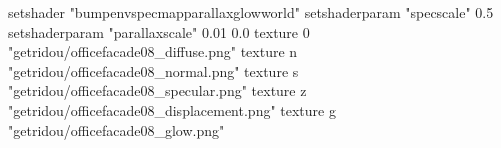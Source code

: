 setshader "bumpenvspecmapparallaxglowworld"
setshaderparam "specscale" 0.5
setshaderparam "parallaxscale" 0.01 0.0
texture 0 "getridou/officefacade08_diffuse.png"
texture n "getridou/officefacade08_normal.png"
texture s "getridou/officefacade08_specular.png"
texture z "getridou/officefacade08_displacement.png"
texture g "getridou/officefacade08_glow.png"
